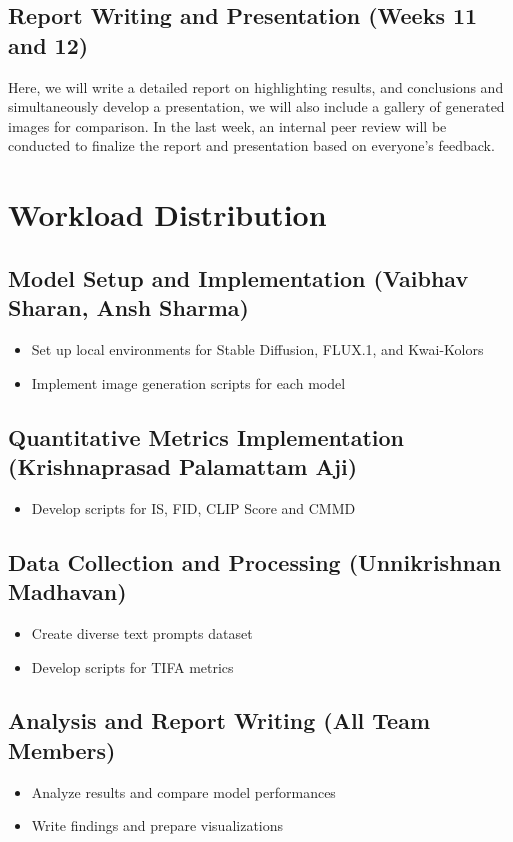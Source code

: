 \documentclass{article}
\begin{document}
\subsection{Report Writing and Presentation (Weeks 11 and 12)}
Here, we will write a detailed report on highlighting results, and conclusions and simultaneously develop a presentation, we will also include a gallery of generated images for comparison. In the last week, an internal peer review will be conducted to finalize the report and presentation based on everyone’s feedback.



\section{Workload Distribution}

\subsection{Model Setup and Implementation (Vaibhav Sharan, Ansh Sharma)}
\begin{itemize}
    \item Set up local environments for Stable Diffusion, FLUX.1, and Kwai-Kolors
    \item Implement image generation scripts for each model
\end{itemize}

\subsection{Quantitative Metrics Implementation (Krishnaprasad Palamattam Aji)}
\begin{itemize}
    \item Develop scripts for IS, FID, CLIP Score and CMMD
\end{itemize}

\subsection{Data Collection and Processing (Unnikrishnan Madhavan)}
\begin{itemize}
    \item Create diverse text prompts dataset
    \item Develop scripts for TIFA metrics
\end{itemize}

\subsection{Analysis and Report Writing (All Team Members)}
\begin{itemize}
    \item Analyze results and compare model performances
    \item Write findings and prepare visualizations
\end{itemize}
\end{document}
